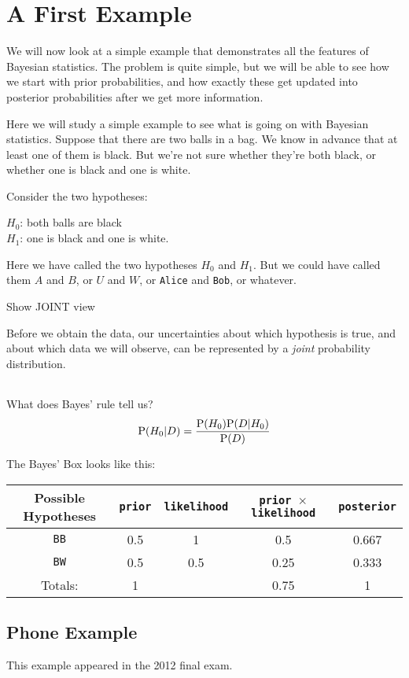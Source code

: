 \chapter{A First Example}
We will now look at a simple example that demonstrates all the features of
Bayesian statistics. The problem is quite simple, but we will be able to see
how we start with prior probabilities, and how exactly these get updated
into posterior probabilities after we get more information.


Here we will study a simple example to see what is going on with Bayesian
statistics. Suppose that there are two balls in a bag. We know in advance
that at least one of them is black. But we're not sure whether they're both
black, or whether one is black and one is white.

Consider the two hypotheses:

$H_0$: both balls are black\\
$H_1$: one is black and one is white.

Here we have called the two hypotheses $H_0$ and $H_1$. But we could have
called them $A$ and $B$, or $U$ and $W$, or {\tt Alice} and {\tt Bob}, or
whatever.


Show JOINT view

Before we obtain the data, our uncertainties about which hypothesis is true,
and about which data we will observe, can be represented by a {\it joint}
probability distribution.

\begin{table}
\begin{center}
\begin{tabular}{|c|c|c|}
\hline
\hline
\end{tabular}
\end{center}
\end{table}

What does Bayes' rule tell us?
\begin{eqnarray}
\textnormal{P}(H_0 | D) = \frac{\textnormal{P}(H_0)\textnormal{P}(D|H_0)}{\textnormal{P}(D)}
\end{eqnarray}




The Bayes' Box looks like this:
\begin{table}[h!]
\begin{center}
\begin{tabular}{|c|c|c|c|c|}
\hline
{\bf Possible Hypotheses} & {\tt prior} & {\tt likelihood} &
{\tt prior $\times$ likelihood} & {\tt posterior}\\
\hline
{\tt BB} & 0.5 & 1   & 0.5  & 0.667\\
{\tt BW} & 0.5 & 0.5 & 0.25 & 0.333\\
\hline
Totals: & 1 & & 0.75 & 1\\
\hline
\end{tabular}
\end{center}
\end{table}


\section{Phone Example}
This example appeared in the 2012 final exam.


